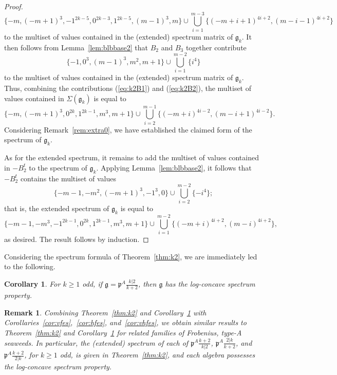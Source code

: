\documentclass[letterpaper,10pt]{article}
\newtheorem{corollary}[theorem]{Corollary}
\newtheorem{remark}[theorem]{Remark}
\begin{document}
\begin{proof}
\begin{equation}\label{eq:k2B1}
\{-m,(-m+1)^3,-1^{2k-5},0^{2k-3},1^{2k-5},(m-1)^3,m\}\cup\bigcup_{i=1}^{m-3}\{(-m+i+1)^{4i+2},(m-i-1)^{4i+2}\}
\end{equation}
to the multiset of values contained in the (extended) spectrum matrix of $\mathfrak{g}_k$. It then follows from Lemma~\ref{lem:blbbase2} that $B_2$ and $B_3$ together contribute 
\begin{equation}\label{eq:k2B2}
    \{-1,0^3,(m-1)^3,m^2,m+1\}\cup\bigcup_{i=1}^{m-2}\{i^4\}
\end{equation}
to the multiset of values contained in the (extended) spectrum matrix of $\mathfrak{g}_k$. Thus, combining the contributions (\ref{eq:k2B1}) and (\ref{eq:k2B2}), the multiset of values contained in $\Sigma(\mathfrak{g}_k)$ is equal to $$\{-m,(-m+1)^3,0^{2k},1^{2k-1},m^3,m+1\}\cup\bigcup_{i=2}^{m-1}\{(-m+i)^{4i-2},(m-i+1)^{4i-2}\}.$$ Considering Remark~\ref{rem:extra0}, we have established the claimed form of the spectrum of $\mathfrak{g}_k$.

As for the extended spectrum, it remains to add the multiset of values contained in $-B_2^t$ to the spectrum of $\mathfrak{g}_k$. Applying Lemma~\ref{lem:blbbase2}, it follows that $-B_2^t$ contains the multiset of values 
$$\{-m-1,-m^2,(-m+1)^3,-1^3,0\}\cup\bigcup_{i=2}^{m-2}\{-i^4\};$$ that is, the extended spectrum of $\mathfrak{g}_k$ is equal to $$\{-m-1,-m^3,-1^{2k-1},0^{2k},1^{2k-1},m^3,m+1\}\cup\bigcup_{i=1}^{m-2}\{(-m+i)^{4i+2},(m-i)^{4i+2}\},$$ as desired. The result follows by induction.
\end{proof}


Considering the spectrum formula of Theorem~\ref{thm:k2}, we are immediately led to the following.

\begin{corollary}\label{cor:k2log}
For $k\ge 1$ odd, if $\mathfrak{g}=\mathfrak{p}^A\frac{k|2}{k+2}$, then $\mathfrak{g}$ has the log-concave spectrum property.
\end{corollary}

\begin{remark}
    Combining Theorem~\ref{thm:k2} and Corollary~\ref{cor:k2log} with Corollaries~\ref{cor:vfes},~\ref{cor:hfes}, and~\ref{cor:vhfes}, we obtain similar results to Theorem~\ref{thm:k2} and Corollary~\ref{cor:k2log} for related families of Frobenius, type-A seaweeds. In particular, the \textup(extended\textup) spectrum of each of $\mathfrak{p}^A\frac{k+2}{k|2}$, $\mathfrak{p}^A\frac{2|k}{k+2}$, and $\mathfrak{p}^A\frac{k+2}{2|k}$, for $k\ge 1$ odd, is given in Theorem~\ref{thm:k2}, and each algebra possesses the log-concave spectrum property.
\end{remark}
\end{document}
